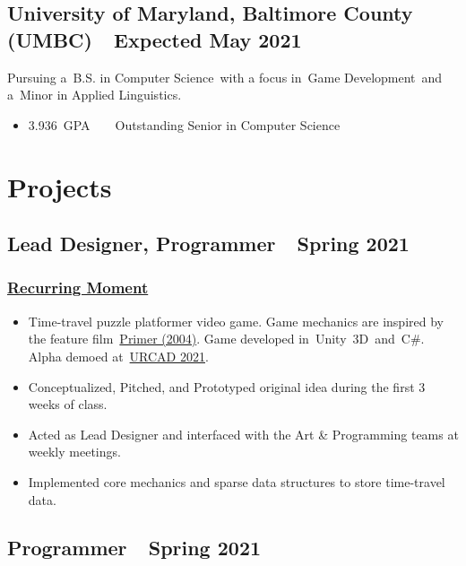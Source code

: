 \documentclass[letterpaper]{article}
\newcommand\textstyleToolPrimaryChar[1]{\textcolor[rgb]{0.18039216,0.45490196,0.70980394}{#1}}
\newcommand\textstyleHyperlink[1]{\textcolor[rgb]{0.019607844,0.3882353,0.75686276}{#1}}
\newcommand\liststyleLFOi{%
\renewcommand\labelitemi{{}-}
\renewcommand\labelitemii{o}
\renewcommand\labelitemiii{${\blacksquare}$}
\renewcommand\labelitemiv{{\textbullet}}
}
\begin{document}
\subsection[University of Maryland, Baltimore County (UMBC)\ \ Expected May 2021]{University of Maryland, Baltimore
County (UMBC)\ \ Expected May 2021}
Pursuing a\ B.S. in Computer Science\ with a focus in\ Game Development\ and a\ Minor in Applied Linguistics.

\liststyleLFOi
\begin{itemize}
\item 3.936\ GPA\ \ \ \ Outstanding Senior in Computer Science
\end{itemize}
\section{Projects}
\subsection[Lead Designer, Programmer\ \ Spring 2021]{Lead Designer, Programmer\ \ Spring 2021}
\subsubsection[Recurring
Moment]{\href{https://github.com/KristianMischke/RecurringMoment/releases}{\textstyleHyperlink{Recurring Moment}}}
\liststyleLFOi
\begin{itemize}
\item Time-travel puzzle platformer video game. Game mechanics are inspired by the feature
film\ \href{https://www.imdb.com/title/tt0390384/}{\textstyleHyperlink{Primer (2004)}}. Game developed
in\ \textstyleToolPrimaryChar{Unity\ 3D}\ and\ \textstyleToolPrimaryChar{C\#}. Alpha demoed
at\ \href{https://d.docs.live.net/bc6d1b9f08998267/Resume/'https:/umbc.voicethread.com/myvoice/thread/17391629/110295400/102619788}{\textstyleHyperlink{URCAD
2021}}.
\item Conceptualized, Pitched, and Prototyped original idea during the first 3 weeks of class.
\item Acted as Lead Designer and interfaced with the Art \& Programming teams at weekly meetings.
\item Implemented core mechanics and sparse data structures to store time-travel data.
\end{itemize}
\subsection[Programmer\ \ Spring 2021]{Programmer\ \ Spring 2021}
\end{document}
